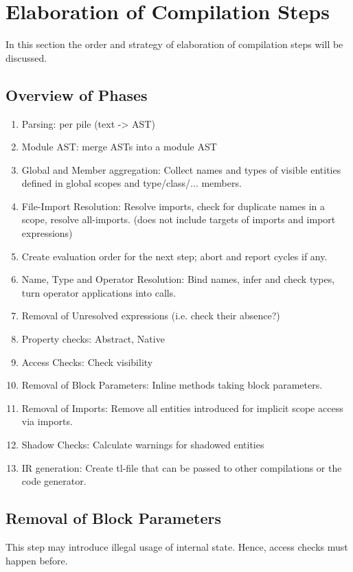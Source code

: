 \section{Elaboration of Compilation Steps}

In this section the order and strategy of elaboration of compilation steps will be discussed.

\subsection{Overview of Phases}

\begin{enumerate}
	\item Parsing: per pile (text -> AST)
	\item Module AST: merge ASTs into a module AST
	\item Global and Member aggregation: Collect names and types of visible entities defined in global scopes and type/class/... members.
    \item File-Import Resolution: Resolve imports, check for duplicate names in a scope, resolve all-imports. (does not include targets of imports and import expressions)
	\item Create evaluation order for the next step; abort and report cycles if any.
	\item Name, Type and Operator Resolution: Bind names, infer and check types, turn operator applications into calls.
    \item Removal of Unresolved expressions (i.e. check their absence?)
	\item Property checks: Abstract, Native
	\item Access Checks: Check visibility
	\item Removal of Block Parameters: Inline methods taking block parameters.
	\item Removal of Imports: Remove all entities introduced for implicit scope access via imports.
	\item Shadow Checks: Calculate warnings for shadowed entities
	\item IR generation: Create tl-file that can be passed to other compilations or the code generator.
\end{enumerate}


\subsection{Removal of Block Parameters}
This step may introduce illegal usage of internal state.
Hence, access checks must happen before.